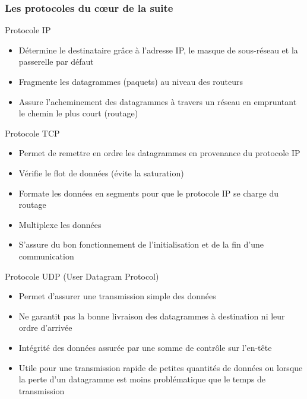 \documentclass{beamer}
\begin{document}
\begin{frame}[allowframebreaks]
    \frametitle{Les protocoles du cœur de la suite}
        \begin{block}{Protocole IP}
            \begin{itemize}
                \item Détermine le destinataire grâce à l'adresse IP, le masque de sous-réseau et la passerelle par défaut
                \item Fragmente les datagrammes (paquets) au niveau des routeurs
                \item Assure l'acheminement des datagrammes à travers un réseau en empruntant le chemin le plus court (routage)
            \end{itemize}
        \end{block}
        
        \begin{block}{Protocole TCP}
            \begin{itemize}
                \item Permet de remettre en ordre les datagrammes en provenance du protocole IP
                \item Vérifie le flot de données (évite la saturation)
                \item Formate les données en segments pour que le protocole IP se charge du routage
                \item Multiplexe les données
                \item S'assure du bon fonctionnement de l'initialisation et de la fin d'une communication
            \end{itemize}
        \end{block}
        
        \begin{block}{Protocole UDP (User Datagram Protocol)}
            \begin{itemize}
                \item Permet d'assurer une transmission simple des données
                \item Ne garantit pas la bonne livraison des datagrammes à destination ni leur ordre d'arrivée
                \item Intégrité des données assurée par une somme de contrôle sur l'en-tête
                \item Utile pour une transmission rapide de petites quantités de données ou lorsque la perte d'un datagramme est moins problématique que le temps de transmission
            \end{itemize}
        \end{block}
    
\end{frame}
\end{document}
